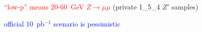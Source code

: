 \documentclass[compress]{beamer}
\begin{document}
\begin{frame}
\begin{columns}
\end{columns}

\vspace{0.25 cm}
\textcolor{red}{``low-p'' means 20-60~GeV $Z\to\mu\mu$} \hfill (private 1\_5\_4 $Z'$ samples)

\textcolor{blue}{official 10~pb$^{-1}$ scenario is pessimistic}
\end{frame}
\end{document}
